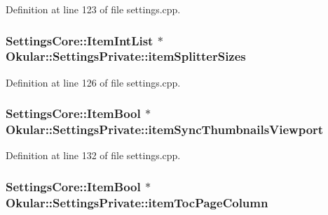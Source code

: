 Definition at line 123 of file settings.\+cpp.

\hypertarget{classOkular_1_1SettingsPrivate_ad5b9f93017723ca704825f3bc5a97088}{
\subsubsection[{item\+Splitter\+Sizes}]{\setlength{\rightskip}{0pt plus 5cm}Settings\+Core\+::\+Item\+Int\+List $\ast$ Okular\+::\+Settings\+Private\+::item\+Splitter\+Sizes}}\label{classOkular_1_1SettingsPrivate_ad5b9f93017723ca704825f3bc5a97088}


Definition at line 126 of file settings.\+cpp.

\hypertarget{classOkular_1_1SettingsPrivate_a86acbdfc27d562a3ba7c66b821b1f3d1}{
\subsubsection[{item\+Sync\+Thumbnails\+Viewport}]{\setlength{\rightskip}{0pt plus 5cm}Settings\+Core\+::\+Item\+Bool $\ast$ Okular\+::\+Settings\+Private\+::item\+Sync\+Thumbnails\+Viewport}}\label{classOkular_1_1SettingsPrivate_a86acbdfc27d562a3ba7c66b821b1f3d1}


Definition at line 132 of file settings.\+cpp.

\hypertarget{classOkular_1_1SettingsPrivate_ab294003c378fb7baf06b6de74950a085}{
\subsubsection[{item\+Toc\+Page\+Column}]{\setlength{\rightskip}{0pt plus 5cm}Settings\+Core\+::\+Item\+Bool $\ast$ Okular\+::\+Settings\+Private\+::item\+Toc\+Page\+Column}}\label{classOkular_1_1SettingsPrivate_ab294003c378fb7baf06b6de74950a085}


